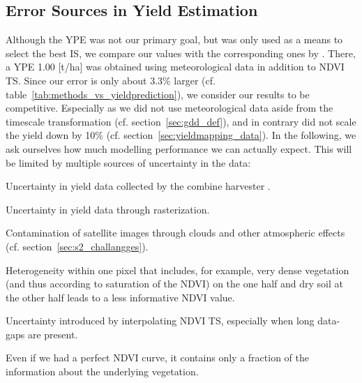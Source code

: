 {    \subsection{Error Sources in Yield Estimation}{\label{sec:discuss_high-rmse-in-yield-prdiction}
        Although the YPE was not our primary goal, but was only used as a means to select the best IS, we compare our values with the corresponding ones by \cite{perichPixelbasedCropYield2022}. There, a YPE 1.00 [t/ha] was obtained using meteorological data in addition to NDVI TS. Since our error is only about 3.3\% larger (cf. table~\ref{tab:methods_vs_yieldprediction}), we consider our results to be competitive. Especially as we did not use meteorological data aside from the timescale transformation (cf. section~\ref{sec:gdd_def}), and in contrary did not scale the yield down by 10\% (cf. section~\ref{sec:yieldmapping_data}). In the following, we ask ourselves how much modelling performance we can actually expect. This will be limited by multiple sources of uncertainty in the data:
        \begin{Nenumerate}
            \item Uncertainty in yield data collected by the combine harvester \citep{robinsonComparingPerformanceTechniques2005}.
            \item Uncertainty in yield data through rasterization.
            \item Contamination of satellite images through clouds and other atmospheric effects (cf. section~\ref{sec:s2_challangges}).
            \item Heterogeneity within one pixel that includes, for example, very dense vegetation (and thus according to \citeauthor{guNDVISaturationAdjustment2013} saturation of the NDVI) on the one half and dry soil at the other half leads to a less informative NDVI value.
            \item Uncertainty introduced by interpolating NDVI TS, especially when long data-gaps are present.
        \end{Nenumerate}
        Even if we had a perfect NDVI curve, it contains only a fraction of the information about the underlying vegetation. 
}}
